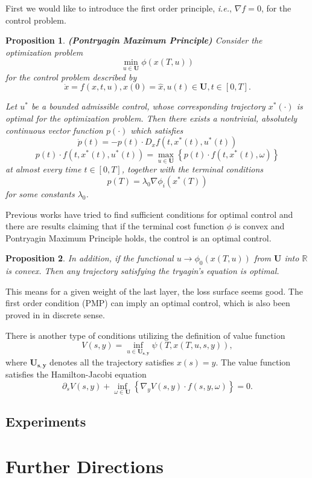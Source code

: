 \documentclass{article}
\theoremstyle{plain}
\newtheorem{prop}{Proposition}
\theoremstyle{definition}
\begin{document}
First we would like to introduce the first order principle, \emph{i.e.}, $\nabla f=0$, for the control problem.
\begin{prop}
	\textbf{(Pontryagin Maximum Principle)} Consider the optimization problem $$\min_{u\in\mathbf{U}} \phi(x(T,u))$$ for the control problem described by
	$$\dot x = f(x,t,u),x(0)=\hat{x},u(t)\in\mathbf{U},t\in [0,T].$$

	Let $u^*$ be a bounded admissible control, whose corresponding trajectory $x^*(\cdot)$ is optimal for the optimization problem. Then there exists a nontrivial, absolutely continuous vector function $p(\cdot)$ which satisfies
	$$\dot{p}(t)=-p(t)\cdot D_xf(t,x^*(t),u^*(t))$$
	$$p(t)\cdot f(t,x^*(t),u^*(t))=\max_{u\in\mathbf{U}}\left\{p(t)\cdot f(t,x^*(t),\omega)\right\}$$
	at almost every time $t\in[0,T]$, together with the terminal conditions
	$$p(T)=\lambda_0\nabla\phi_i(x^*(T))$$
	for some constants $\lambda_0$.
\end{prop}

Previous works have tried to find sufficient conditions for optimal control and there are results claiming that if the terminal cost function $\phi$ is convex and Pontryagin Maximum Principle holds, the control is an optimal control.


\begin{prop}
	In addition, if the functional $u\rightarrow \phi_0(x(T,u))$ from $\mathbf{U}$ into $\mathbb{R}$ is convex. Then any trajectory satisfying the tryagin's equation is optimal.
\end{prop}

This means for a given weight of the last layer, the loss surface seems good. The first order condition (PMP) can imply an optimal control, which is also been proved in \cite{bartlett2018representing} in discrete sense.

There is another type of conditions utilizing the definition of value function 
$$V(s,y)=\inf_{u\in\mathbf{U_{s,y}}}\psi(T,x(T,u,s,y)),$$ 
where $\mathbf{U_{s,y}}$ denotes all the trajectory satisfies $x(s)=y$. The value function satisfies the Hamilton-Jacobi equation $$\partial_sV(s,y)+\inf_{\omega\in\mathbf{U}}\left\{\nabla_yV(s,y)\cdot f(s,y,\omega)\right\}=0.$$
\subsection{Experiments}

\section{Further Directions}
\end{document}
